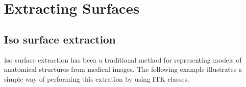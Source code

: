 \ifitkFullVersion

\fi



\section{Extracting Surfaces}
\label{sec:ExtractingSurfaces}

\subsection{Iso surface extraction}

Iso surface extraction has been a traditional method for representing models of
anatomical structures from medical images. The following example illustrates a
simple way of performing this extration by using ITK classes.


\ifitkFullVersion

\fi





